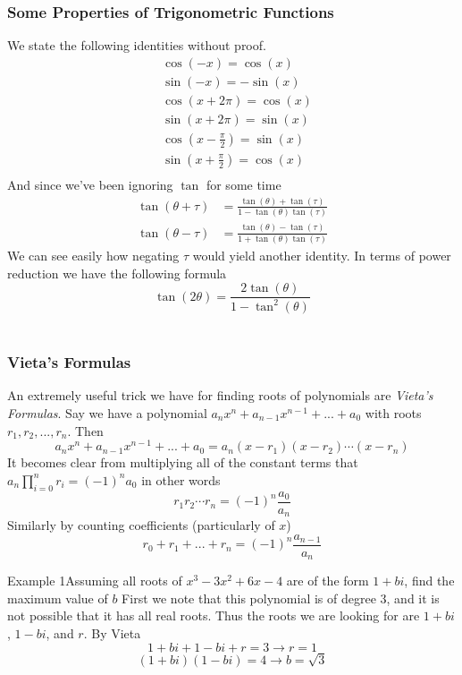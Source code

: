 \subsubsection{Some Properties of Trigonometric Functions}
We state the following identities without proof.
\begin{align*}
	&\cos(-x) = \cos(x)\\
	&\sin(-x) = -\sin(x)\\
	&\cos(x + 2\pi) = \cos(x)\\
	&\sin(x + 2\pi) = \sin(x)\\
	&\cos\left(x - \frac{\pi}{2}\right) = \sin(x)\\
	&\sin\left( x + \frac{\pi}{2}\right) = \cos(x)\\
\end{align*}
And since we've been ignoring $\tan$ for some time
\begin{align*}
	\tan(\theta + \tau) & = \frac{\tan(\theta)+\tan(\tau)}{1-\tan(\theta)\tan(\tau)} \\
	\tan(\theta - \tau) & = \frac{\tan(\theta) - \tan(\tau)}{1 + \tan(\theta)\tan(\tau)}
\end{align*}
We can see easily how negating $\tau$ would yield another identity. In terms of power reduction we have the following formula 
$$\tan(2\theta) = \frac{2\tan(\theta)}{1-\tan^{2}(\theta)}$$\\

\subsubsection{Vieta's Formulas}
An extremely useful trick we have for finding roots of polynomials are \textit{Vieta's Formulas}.
Say we have a polynomial $a_n x^n + a_{n-1}x^{n-1} + ... + a_{0}$ with roots $r_{1}, r_2, ..., r_n$.
Then $$a_{n}x^n + a_{n-1}x^{n-1} + ... + a_0 = a_{n}(x-r_1)(x-r_2)\cdots(x-r_n)$$
It becomes clear from multiplying all of the constant terms that $a_{n}\prod_{i=0}^{n}r_i = (-1)^{n}a_0$ in other words $$r_1 r_2 \cdots r_n = (-1)^{n}\frac{a_0}{a_n}$$
Similarly by counting coefficients (particularly of $x$)$$r_0 + r_1 + ... + r_n = (-1)^{n} \frac{a_{n-1}}{a_n}$$

\begin{problem}{Example 1}{Assuming all roots of $x^3 - 3x^2 + 6x - 4$ are of the form $1+bi$, find the maximum value of $b$}
	First we note that this polynomial is of degree 3, and it is not possible that it has all real roots.
	Thus the roots we are looking for are $1+bi$, $1-bi$, and $r$. By Vieta $$1+bi + 1 -bi + r = 3 \rightarrow r = 1$$
	$$(1+bi)(1-bi) = 4 \rightarrow b = \sqrt{3}$$
\end{problem}

